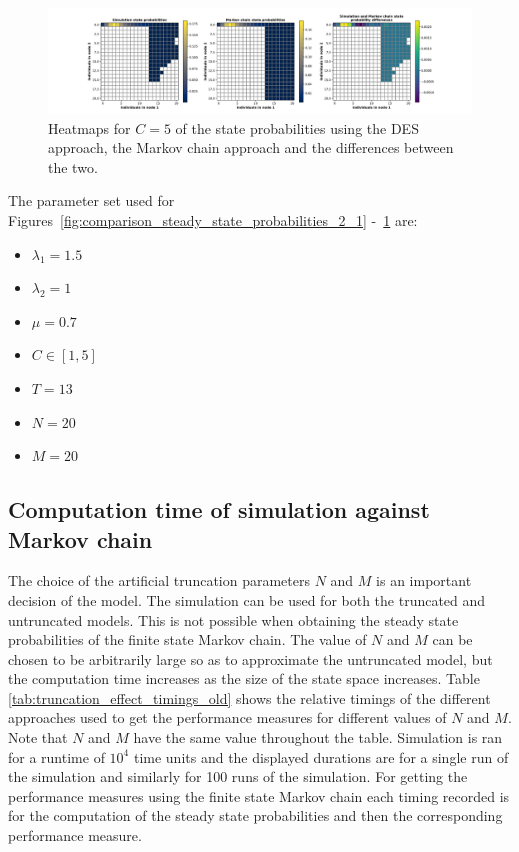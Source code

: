 \begin{figure}[H]
    \includegraphics[width=\textwidth, trim=100 10 100 10, clip]{chapters/03_queueing_model/img/numeric_results_and_timings/steady_state_probabilities_2/main_5.pdf}
    \caption{Heatmaps for \(C = 5\) of the state probabilities using the
    DES approach, the Markov chain approach and the differences between the
    two.}
    \label{fig:comparison_steady_state_probabilities_2_5}
\end{figure}


The parameter set used for
Figures~\ref{fig:comparison_steady_state_probabilities_2_1}
-~\ref{fig:comparison_steady_state_probabilities_2_5} are:

\begin{multicols}{3}
    \begin{itemize}
        \item \(\lambda_1 = 1.5\)
        \item \(\lambda_2 = 1\)
        \item \(\mu = 0.7\)
        \item \(C \in [1, 5]\)
        \item \(T = 13\)
        \item \(N = 20\)
        \item \(M = 20\)
    \end{itemize}    
\end{multicols}


\subsection{Computation time of simulation against Markov chain }

The choice of the artificial truncation parameters \(N\) and \(M\) is an
important decision of the model.
The simulation can be used for both the truncated and untruncated models.
This is not possible when obtaining the steady state probabilities of the
finite state Markov chain.
The value of \(N\) and \(M\) can be chosen to be arbitrarily large so as to
approximate the untruncated model, but the
computation time increases as the size of the state space increases.
Table \ref{tab:truncation_effect_timings_old} shows the relative timings of the
different approaches used to get the performance measures for different values
of \(N\) and \(M\).
Note that \(N\) and \(M\) have the same value throughout the table.
Simulation is ran for a runtime of \(10^4\) time units and the displayed
durations are for a single run of the simulation and similarly for 100 runs of
the simulation.
For getting the performance measures using the finite state Markov chain each
timing recorded is for the computation of the steady state probabilities and
then the corresponding performance measure.

